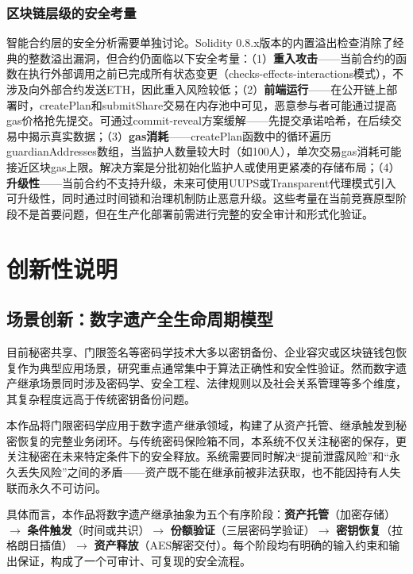\documentclass[UTF8,a4paper,zihao=-4,openany]{ctexrep}
\begin{document}
\subsection{区块链层级的安全考量}

智能合约层的安全分析需要单独讨论。Solidity 0.8.x版本的内置溢出检查消除了经典的整数溢出漏洞，但合约仍面临以下安全考量：（1）\textbf{重入攻击}——当前合约的函数在执行外部调用之前已完成所有状态变更（checks-effects-interactions模式），不涉及向外部合约发送ETH，因此重入风险较低；（2）\textbf{前端运行}——在公开链上部署时，createPlan和submitShare交易在内存池中可见，恶意参与者可能通过提高gas价格抢先提交。可通过commit-reveal方案缓解——先提交承诺哈希，在后续交易中揭示真实数据；（3）\textbf{gas消耗}——createPlan函数中的循环遍历guardianAddresses数组，当监护人数量较大时（如100人），单次交易gas消耗可能接近区块gas上限。解决方案是分批初始化监护人或使用更紧凑的存储布局；（4）\textbf{升级性}——当前合约不支持升级，未来可使用UUPS或Transparent代理模式引入可升级性，同时通过时间锁和治理机制防止恶意升级。这些考量在当前竞赛原型阶段不是首要问题，但在生产化部署前需进行完整的安全审计和形式化验证。

\chapter{创新性说明}

\section{场景创新：数字遗产全生命周期模型}

目前秘密共享、门限签名等密码学技术大多以密钥备份、企业容灾或区块链钱包恢复作为典型应用场景，研究重点通常集中于算法正确性和安全性验证。然而数字遗产继承场景同时涉及密码学、安全工程、法律规则以及社会关系管理等多个维度，其复杂程度远高于传统密钥备份问题。

本作品将门限密码学应用于数字遗产继承领域，构建了从资产托管、继承触发到秘密恢复的完整业务闭环。与传统密码保险箱不同，本系统不仅关注秘密的保存，更关注秘密在未来特定条件下的安全释放。系统需要同时解决“提前泄露风险”和“永久丢失风险”之间的矛盾——资产既不能在继承前被非法获取，也不能因持有人失联而永久不可访问。

具体而言，本作品将数字遗产继承抽象为五个有序阶段：\textbf{资产托管}（加密存储）$\to$ \textbf{条件触发}（时间或共识）$\to$ \textbf{份额验证}（三层密码学验证）$\to$ \textbf{密钥恢复}（拉格朗日插值）$\to$ \textbf{资产释放}（AES解密交付）。每个阶段均有明确的输入约束和输出保证，构成了一个可审计、可复现的安全流程。
\end{document}
